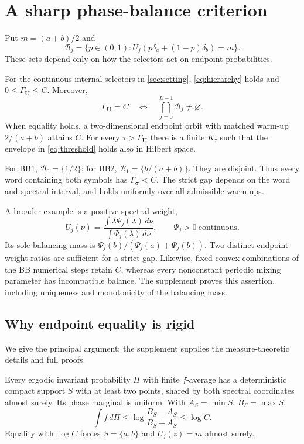 \documentclass[letterpaper,twoside]{article}
\begin{document}
\section{A sharp phase-balance criterion}\label{sec:balance}
Put $m=(a+b)/2$ and
\[
 \mathcal B_j=\{p\in(0,1):U_j(p\delta_a+(1-p)\delta_b)=m\}.
\]
These sets depend only on how the selectors act on endpoint probabilities.

\begin{theorem}\label{thm:main}
For the continuous internal selectors in \cref{sec:setting}, \cref{eq:hierarchy} holds and $0\le\Gamma_{\bm U}\le C$. Moreover,
\begin{equation}\label{eq:balance-main}
 \Gamma_{\bm U}=C
 \quad\Longleftrightarrow\quad
 \bigcap_{j=0}^{L-1}\mathcal B_j\ne\varnothing.
\end{equation}
When equality holds, a two-dimensional endpoint orbit with matched warm-up $2/(a+b)$ attains $C$. For every $\tau>\Gamma_{\bm U}$ there is a finite $K_\tau$ such that the envelope in \cref{eq:threshold} holds also in Hilbert space.
\end{theorem}

For BB1, $\mathcal B_0=\{1/2\}$; for BB2, $\mathcal B_1=\{b/(a+b)\}$. They are disjoint. Thus every word containing both symbols has $\Gamma_{\bm\sigma}<C$. The strict gap depends on the word and spectral interval, and holds uniformly over all admissible warm-ups.

A broader example is a positive spectral weight,
\[
 U_j(\nu)=\frac{\int\lambda\Psi_j(\lambda)\,d\nu}
                  {\int\Psi_j(\lambda)\,d\nu},
 \qquad \Psi_j>0\ \text{continuous}.
\]
Its sole balancing mass is $\Psi_j(b)/(\Psi_j(a)+\Psi_j(b))$. Two distinct endpoint weight ratios are sufficient for a strict gap. Likewise, fixed convex combinations of the BB numerical steps \cite{DaiHuangLiu2019} retain $C$, whereas every nonconstant periodic mixing parameter has incompatible balance. The supplement proves this assertion, including uniqueness and monotonicity of the balancing mass.

\subsection{Why endpoint equality is rigid}
We give the principal argument; the supplement supplies the measure-theoretic details and full proofs.

\begin{lemma}\label{lem:rigidity}
Every ergodic invariant probability $\Pi$ with finite $f$-average has a deterministic compact support $S$ with at least two points, shared by both spectral coordinates almost surely. Its phase marginal is uniform. With $A_S=\min S$, $B_S=\max S$,
\[
 \int f\,d\Pi\le\log\frac{B_S-A_S}{B_S+A_S}\le\log C.
\]
Equality with $\log C$ forces $S=\{a,b\}$ and $U_j(z)=m$ almost surely.
\end{lemma}
\end{document}
